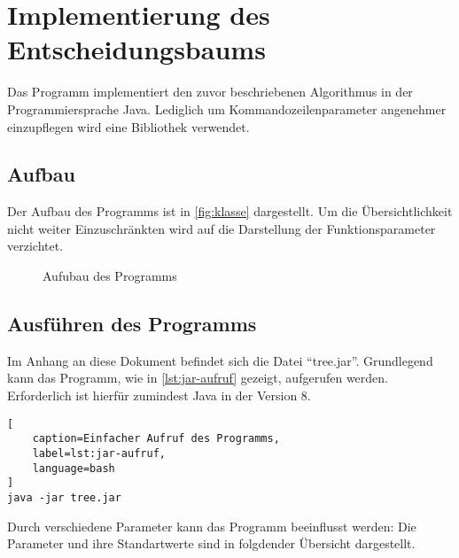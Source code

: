 \section{Implementierung des Entscheidungsbaums}\label{sec:implementierung}
Das Programm implementiert den zuvor beschriebenen Algorithmus in der Programmiersprache Java.
Lediglich um Kommandozeilenparameter angenehmer einzupflegen wird eine Bibliothek verwendet.

\subsection{Aufbau}
Der Aufbau des Programms ist in \autoref{fig:klasse} dargestellt.
Um die Übersichtlichkeit nicht weiter Einzuschränkten wird auf die Darstellung der Funktionsparameter verzichtet.

\begin{figure}[ht!]
    \centering
    \resizebox{\textwidth}{!}{
        
    }
    \caption{Aufubau des Programms}
    \label{fig:klasse}
\end{figure}

\subsection{Ausführen des Programms}
Im Anhang an diese Dokument befindet sich die Datei \enquote{tree.jar}.
Grundlegend kann das Programm, wie in \autoref{lst:jar-aufruf} gezeigt, aufgerufen werden.
Erforderlich ist hierfür zumindest Java in der Version 8.

\begin{lstlisting}[
    caption=Einfacher Aufruf des Programms,
    label=lst:jar-aufruf,
    language=bash
]
java -jar tree.jar
\end{lstlisting}

Durch verschiedene Parameter kann das Programm beeinflusst werden:
Die Parameter und ihre Standartwerte sind in folgdender Übersicht dargestellt.

